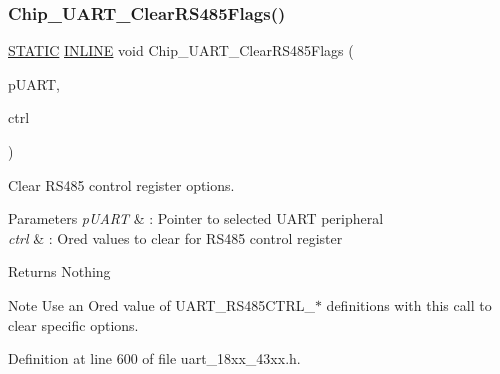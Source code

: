 \subsubsection{\texorpdfstring{Chip\+\_\+\+U\+A\+R\+T\+\_\+\+Clear\+R\+S485\+Flags()}{Chip\_UART\_ClearRS485Flags()}}
{\footnotesize\ttfamily \hyperlink{group___l_p_c___types___public___macros_ga10b2d890d871e1489bb02b7e70d9bdfb}{S\+T\+A\+T\+IC} \hyperlink{spifi__18xx__43xx_8h_a2eb6f9e0395b47b8d5e3eeae4fe0c116}{I\+N\+L\+I\+NE} void Chip\+\_\+\+U\+A\+R\+T\+\_\+\+Clear\+R\+S485\+Flags (\begin{DoxyParamCaption}\item[{\hyperlink{struct_l_p_c___u_s_a_r_t___t}{L\+P\+C\+\_\+\+U\+S\+A\+R\+T\+\_\+T} $\ast$}]{p\+U\+A\+RT,  }\item[{uint32\+\_\+t}]{ctrl }\end{DoxyParamCaption})}



Clear R\+S485 control register options. 


\begin{DoxyParams}{Parameters}
{\em p\+U\+A\+RT} & \+: Pointer to selected U\+A\+RT peripheral \\
\hline
{\em ctrl} & \+: Or\textquotesingle{}ed values to clear for R\+S485 control register \\
\hline
\end{DoxyParams}
\begin{DoxyReturn}{Returns}
Nothing 
\end{DoxyReturn}
\begin{DoxyNote}{Note}
Use an Or\textquotesingle{}ed value of U\+A\+R\+T\+\_\+\+R\+S485\+C\+T\+R\+L\+\_\+$\ast$ definitions with this call to clear specific options. 
\end{DoxyNote}


Definition at line 600 of file uart\+\_\+18xx\+\_\+43xx.\+h.

\mbox{\label{group___u_a_r_t__18_x_x__43_x_x_ga26626229fe35e820bf2daf6a87c43155}} 
